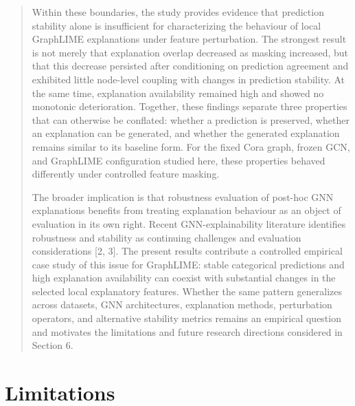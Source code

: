 \documentclass[a4paper]{article}
\begin{document}
\begin{quote}
Within these boundaries, the study provides evidence that prediction
stability alone is insufficient for characterizing the behaviour of
local GraphLIME explanations under feature perturbation. The strongest
result is not merely that explanation overlap decreased as masking
increased, but that this decrease persisted after conditioning on
prediction agreement and exhibited little node-level coupling with
changes in prediction stability. At the same time, explanation
availability remained high and showed no monotonic deterioration.
Together, these findings separate three properties that can otherwise be
conflated: whether a prediction is preserved, whether an explanation can
be generated, and whether the generated explanation remains similar to
its baseline form. For the fixed Cora graph, frozen GCN, and GraphLIME
configuration studied here, these properties behaved differently under
controlled feature masking.

The broader implication is that robustness evaluation of post-hoc GNN
explanations benefits from treating explanation behaviour as an object
of evaluation in its own right. Recent GNN-explainability literature
identifies robustness and stability as continuing challenges and
evaluation considerations {[}2, 3{]}. The present results contribute a
controlled empirical case study of this issue for GraphLIME: stable
categorical predictions and high explanation availability can coexist
with substantial changes in the selected local explanatory features.
Whether the same pattern generalizes across datasets, GNN architectures,
explanation methods, perturbation operators, and alternative stability
metrics remains an empirical question and motivates the limitations and
future research directions considered in Section 6.
\end{quote}

\section{\texorpdfstring{Limitations }{Limitations }}\label{limitations}
\end{document}
